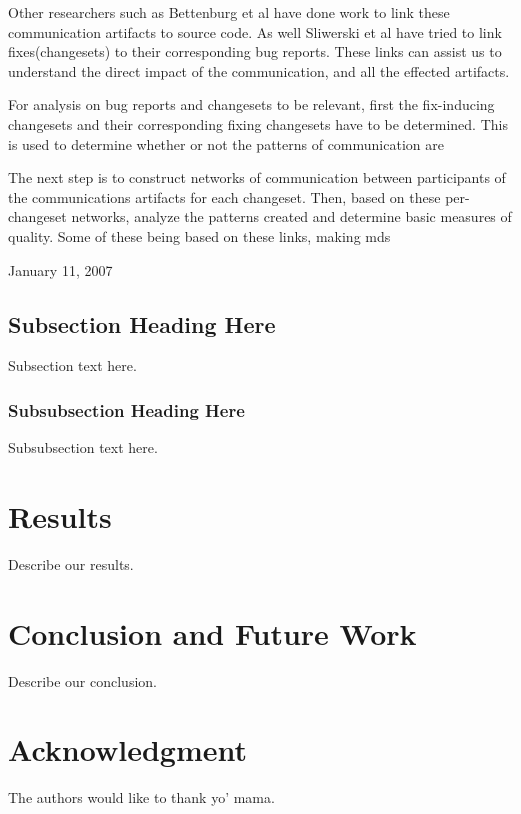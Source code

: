 \documentclass[conference]{IEEEtran}
\begin{document}
Other researchers such as Bettenburg et al have done work to link these communication artifacts to source code\cite{Bettenburg:2008:ESI:1370750.1370757}.  As well Sliwerski et al have tried to link fixes(changesets) to their corresponding bug reports\cite{Sliwerski:2005:CIF:1083142.1083147}.  These links can assist us to understand the direct impact of the communication, and all the effected artifacts.    

For analysis on bug reports and changesets to be relevant, first the fix-inducing changesets\cite{Sliwerski:2005:CIF:1083142.1083147} and their corresponding fixing changesets have to be determined.  This is used to determine whether or not the patterns of communication are 

The next step is to construct networks of communication between participants of the communications artifacts for each changeset.  Then, based on these per-changeset networks, analyze the patterns created and determine basic measures of quality.  Some of these being based on these links, making  
\hfill mds
 
\hfill January 11, 2007

\subsection{Subsection Heading Here}
Subsection text here.

\subsubsection{Subsubsection Heading Here}
Subsubsection text here.


\section{Results}
Describe our results.


\section{Conclusion and Future Work}
Describe our conclusion.


\section*{Acknowledgment}
The authors would like to thank yo' mama.






\end{document}
